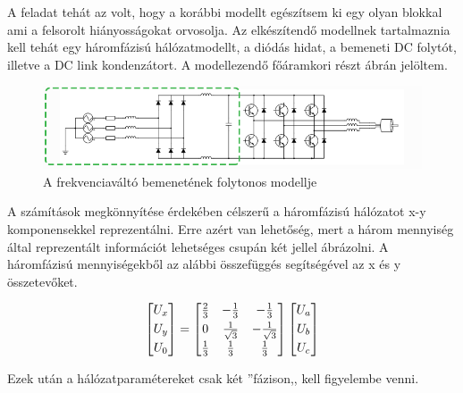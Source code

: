 A feladat tehát az volt, hogy a korábbi modellt egészítsem ki egy olyan blokkal ami a felsorolt hiányosságokat orvosolja. Az elkészítendő modellnek tartalmaznia kell tehát egy háromfázisú hálózatmodellt, a diódás hidat, a bemeneti DC folytót, illetve a DC link kondenzátort. A modellezendő főáramkori részt  ábrán jelöltem. 

\begin{figure}[H!]
	\centering
	\includegraphics[width = \textwidth]{figures/VFDschematic_choke_marked.png}
	\caption{A frekvenciaváltó bemenetének folytonos modellje} 
	\label{fig:input_marked}
\end{figure}

A számítások megkönnyítése érdekében célszerű a háromfázisú hálózatot x-y komponensekkel reprezentálni. Erre azért van lehetőség, mert a három mennyiség által reprezentált információt lehetséges csupán két jellel ábrázolni. A háromfázisú mennyiségekből az alábbi összefüggés segítségével az x és y összetevőket.

\begin{equation}
$$
\centering
\begin{bmatrix}
       U_x\\[0.3em]
       U_y\\[0.3em]
       U_0 
\end{bmatrix}
=
\begin{bmatrix}
       \frac{2}{3} & -\frac{1}{3} & -\frac{1}{3}  \\[0.3em]
       0 & \frac{1}{\sqrt{3}} & -\frac{1}{\sqrt{3}}  \\[0.3em]
       \frac{1}{3} & \frac{1}{3} & \frac{1}{3}    
\end{bmatrix}
\begin{bmatrix}
       U_a\\[0.3em]
       U_b\\[0.3em]
       U_c    
\end{bmatrix}
$$
\end{equation}

Ezek után a hálózatparamétereket csak két ''fázison,, kell figyelembe venni.  


